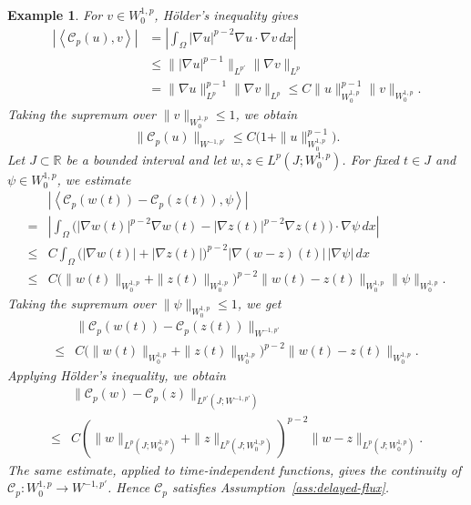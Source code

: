 \documentclass[a4paper,11pt,oneside,reqno]{amsart}
\newtheorem{example}[theorem]{Example}
\newcounter{c}
\newcounter{d}
\newcounter{b}
\newcommand{\R}{\mathbb{R}}
\newcommand{\dual}[2]{\left\langle #1,#2\right\rangle}
\begin{document}
\begin{example}
For \(v\in W^{1,p}_0\), H\"older's inequality gives
\[
\begin{aligned}
 \left|\dual{\mathcal C_p(u)}{v}\right|
 &=
 \left|
 \int_\Omega |\nabla u|^{p-2}\nabla u\cdot\nabla v\,dx
 \right|  \\
 &\le
 \bigl\||\nabla u|^{p-1}\bigr\|_{L^{p'}}
 \|\nabla v\|_{L^p}  \\
 &=
 \|\nabla u\|_{L^p}^{p-1}\|\nabla v\|_{L^p}
 \le
 C\|u\|_{W^{1,p}_0}^{p-1}\|v\|_{W^{1,p}_0}.
\end{aligned}
\]
Taking the supremum over \(\|v\|_{W^{1,p}_0}\le1\), we obtain
\[
 \|\mathcal C_p(u)\|_{W^{-1,p'}}
 \le
 C\bigl(1+\|u\|_{W^{1,p}_0}^{p-1}\bigr).
\]
Let \(J\subset\R\) be a bounded interval and let
\(w,z\in L^p(J;W^{1,p}_0)\). For fixed \(t\in J\) and
\(\psi\in W^{1,p}_0\), we estimate
\[
\begin{aligned}
&\left|
 \dual{\mathcal C_p(w(t))-\mathcal C_p(z(t))}{\psi}
\right|  \\
={}&
\left|
 \int_\Omega
 \bigl(
 |\nabla w(t)|^{p-2}\nabla w(t)
 -
 |\nabla z(t)|^{p-2}\nabla z(t)
 \bigr)\cdot\nabla\psi\,dx
\right|  \\
\le{}&
 C\int_\Omega
 \bigl(|\nabla w(t)|+|\nabla z(t)|\bigr)^{p-2}
 |\nabla(w-z)(t)|\,|\nabla\psi|\,dx  \\
\le{}&
 C
 \bigl(
  \|w(t)\|_{W^{1,p}_0}
  +\|z(t)\|_{W^{1,p}_0}
 \bigr)^{p-2}
 \|w(t)-z(t)\|_{W^{1,p}_0}
 \|\psi\|_{W^{1,p}_0}.
\end{aligned}
\]
Taking the supremum over \(\|\psi\|_{W^{1,p}_0}\le1\), we get
\[
\begin{aligned}
&\|\mathcal C_p(w(t))-\mathcal C_p(z(t))\|_{W^{-1,p'}}  \\
\le{}&
 C
 \bigl(
  \|w(t)\|_{W^{1,p}_0}
  +\|z(t)\|_{W^{1,p}_0}
 \bigr)^{p-2}
 \|w(t)-z(t)\|_{W^{1,p}_0}.
\end{aligned}
\]
Applying H\"older's inequality,
we obtain
\[
\begin{aligned}
&\|\mathcal C_p(w)-\mathcal C_p(z)\|_{L^{p'}(J;W^{-1,p'})}  \\
\le{}&
 C
 \left(
  \|w\|_{L^p(J;W^{1,p}_0)}
  +\|z\|_{L^p(J;W^{1,p}_0)}
 \right)^{p-2}
 \|w-z\|_{L^p(J;W^{1,p}_0)} .
\end{aligned}
\]
The same estimate, applied to time-independent functions, gives the
continuity of \(\mathcal C_p:W^{1,p}_0\to W^{-1,p'}\). Hence
\(\mathcal C_p\) satisfies Assumption~\ref{ass:delayed-flux}.


\end{example}
\end{document}
